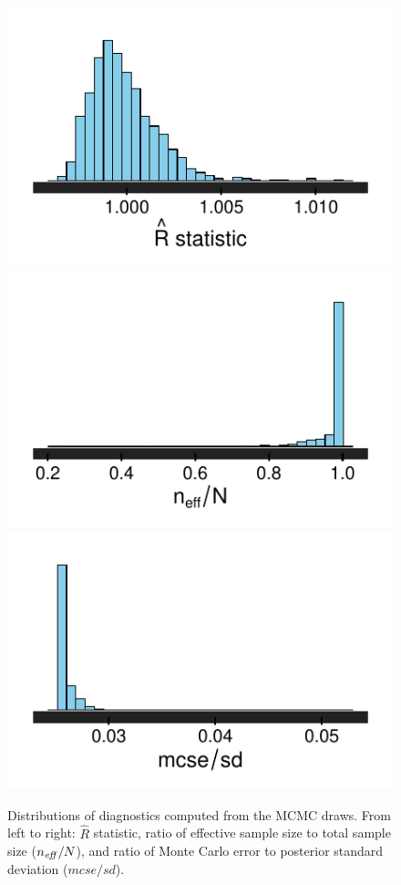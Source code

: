 \begin{figure}[h]
\centering
	\includegraphics[scale=0.7]{sections/figs/rhat}
	\includegraphics[scale=0.7]{sections/figs/neff}
	\includegraphics[scale=0.7]{sections/figs/mcse}
\caption{Distributions of diagnostics computed from the MCMC draws. From left to right: $\hat{R}$ statistic,  ratio of effective sample size to total sample size ($n_{\it eff}/N$), and ratio of Monte Carlo error to posterior standard deviation ($mcse/sd$).}
\label{fig:ck_diagnostics}
\end{figure}


